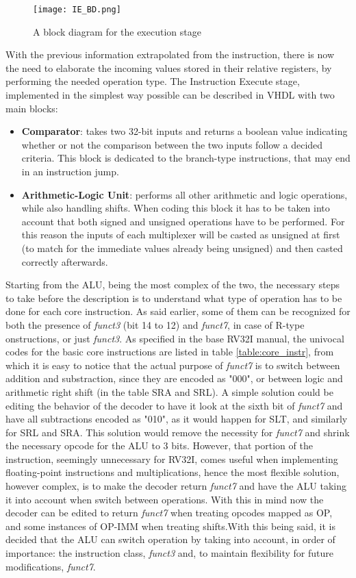 \begin{figure}[ht]
    \centering
    \texttt{[image: IE\_BD.png]}
    \caption{A block diagram for the execution stage}
    \label{fig:IE_BD}
\end{figure}

With the previous information extrapolated from the instruction, there is now the need to elaborate the incoming values stored in their relative registers, by performing the needed operation type.
The Instruction Execute stage, implemented in the simplest way possible can be described in VHDL with two main blocks:
\begin{itemize}
\item \textbf{Comparator}: takes two 32-bit inputs and returns a boolean value indicating whether or not the comparison between the two inputs follow a decided criteria. This block is dedicated to the branch-type instructions, that may end in an instruction jump.
\item \textbf{Arithmetic-Logic Unit}: performs all other arithmetic and logic operations, while also handling shifts. When coding this block it has to be taken into account that both signed and unsigned operations have to be performed. For this reason the inputs of each multiplexer will be casted as unsigned at first (to match for the immediate values already being unsigned) and then casted correctly afterwards. 
\end{itemize}
Starting from the ALU, being the most complex of the two, the necessary steps to take before the description is to understand what type of operation has to be done for each core instruction. As said earlier, some of them can be recognized for both the presence of \emph{funct3} (bit 14 to 12) and \emph{funct7}, in case of R-type onstructions, or just \emph{funct3}. As specified in the base RV32I manual, the univocal codes for the basic core instructions are listed in table \ref{table:core_instr}, from which it is easy to notice that the actual purpose of \emph{funct7} is to switch between addition and substraction, since they are encoded as "000", or between logic and arithmetic right shift (in the table SRA and SRL). A simple solution could be editing the behavior of the decoder to have it look at the sixth bit of \emph{funct7} and have all subtractions encoded as "010", as it would happen for SLT, and similarly for SRL and SRA. This solution would remove the necessity for \emph{funct7} and shrink the necessary opcode for the ALU to 3 bits. However, that portion of the instruction, seemingly unnecessary for RV32I, comes useful when implementing floating-point instructions and multiplications, hence the most flexible solution, however complex, is to make the decoder return \emph{funct7} and have the ALU taking it into account when switch between operations.
With this in mind now the decoder can be edited to return \emph{funct7} when treating opcodes mapped as OP, and some instances of OP-IMM when treating shifts.With this being said, it is decided that the ALU can switch operation by taking into account, in order of importance: the instruction class, \emph{funct3} and, to maintain flexibility for future modifications, \emph{funct7}.


